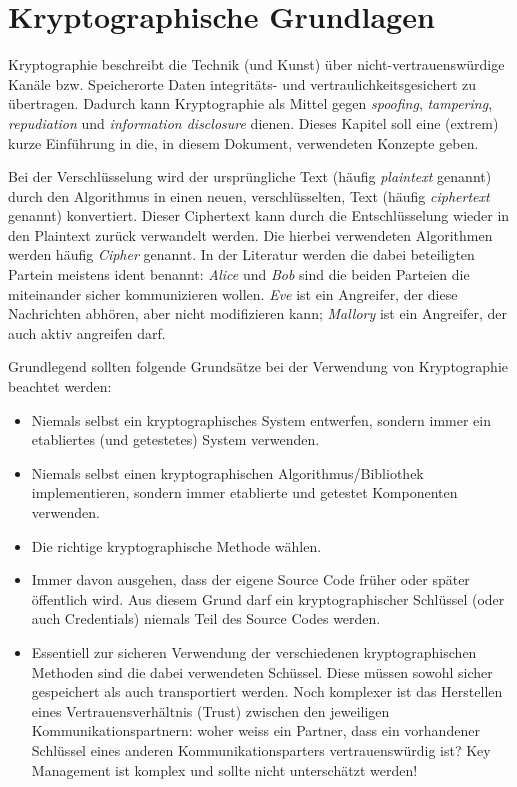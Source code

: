 \chapter{Kryptographische Grundlagen}

Kryptographie beschreibt die Technik (und Kunst) über nicht-vertrauenswürdige Kanäle bzw. Speicherorte Daten integritäts- und vertraulichkeitsgesichert zu übertragen. Dadurch kann Kryptographie als Mittel gegen \textit{spoofing}, \textit{tampering}, \textit{repudiation} und \textit{information disclosure} dienen. Dieses Kapitel soll eine (extrem) kurze Einführung in die, in diesem Dokument, verwendeten Konzepte geben.

Bei der Verschlüsselung wird der ursprüngliche Text (häufig \textit{plaintext} genannt) durch den Algorithmus in einen neuen, verschlüsselten, Text (häufig \textit{ciphertext} genannt) konvertiert. Dieser Ciphertext kann durch die Entschlüsselung wieder in den Plaintext zurück verwandelt werden. Die hierbei verwendeten Algorithmen werden häufig \textit{Cipher} genannt. In der Literatur werden die dabei beteiligten Partein meistens ident benannt: \textit{Alice} und \textit{Bob} sind die beiden Parteien die miteinander sicher kommunizieren wollen. \textit{Eve} ist ein Angreifer, der diese Nachrichten abhören, aber nicht modifizieren kann; \textit{Mallory} ist ein Angreifer, der auch aktiv angreifen darf.

Grundlegend sollten folgende Grundsätze bei der Verwendung von Kryptographie beachtet werden:

\begin{itemize}
	\item Niemals selbst ein kryptographisches System entwerfen, sondern immer ein etabliertes (und getestetes) System verwenden.
	\item Niemals selbst einen kryptographischen Algorithmus/Bibliothek implementieren, sondern immer etablierte und getestet Komponenten verwenden.
	\item Die richtige kryptographische Methode wählen.
	\item Immer davon ausgehen, dass der eigene Source Code früher oder später öffentlich wird. Aus diesem Grund darf ein kryptographischer Schlüssel (oder auch Credentials) niemals Teil des Source Codes werden.
	\item Essentiell zur sicheren Verwendung der verschiedenen kryptographischen Methoden sind die dabei verwendeten Schüssel. Diese müssen sowohl sicher gespeichert als auch transportiert werden. Noch komplexer ist das Herstellen eines Vertrauensverhältnis (Trust) zwischen den jeweiligen Kommunikationspartnern: woher weiss ein Partner, dass ein vorhandener Schlüssel eines anderen Kommunikationsparters vertrauenswürdig ist? Key Management ist komplex und sollte nicht unterschätzt werden!
\end{itemize}

